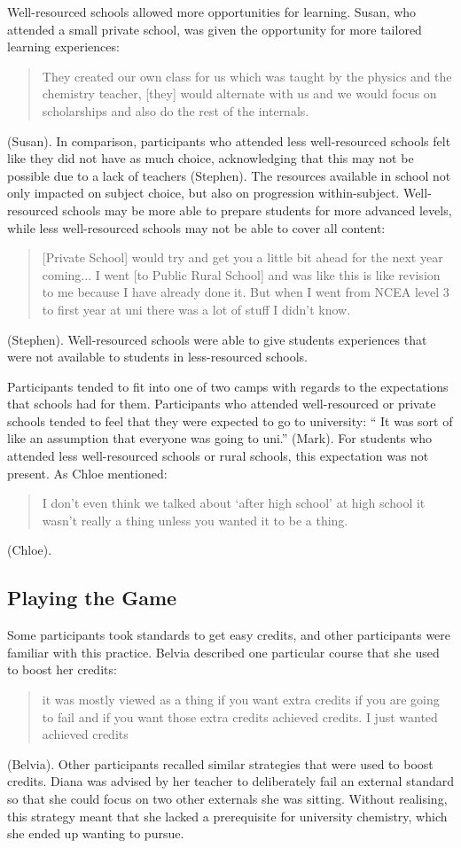 \documentclass[a4paper,man,natbib]{apa6}
\begin{document}
Well-resourced schools allowed more opportunities for learning. Susan, who attended a small private school, was given the opportunity for more tailored learning experiences: \blockquote{They created our own class for us which was taught by the physics and the chemistry teacher, [they] would alternate with us and we would focus on scholarships and also do the rest of the internals.} (Susan). In comparison, participants who attended less well-resourced schools felt like they did not have as much choice, acknowledging that this may not be possible due to a lack of teachers (Stephen). The resources available in school not only impacted on subject choice, but also on progression within-subject. Well-resourced schools may be more able to prepare students for more advanced levels, while less well-resourced schools may not be able to cover all content: \blockquote{[Private School] would try and get you a little bit ahead for the next year coming... I went [to Public Rural School] and was like this is like revision to me because I have already done it. But when I went from NCEA level 3 to first year at uni there was a lot of stuff I didn't know.} (Stephen). Well-resourced schools were able to give students experiences that were not available to students in less-resourced schools. 

Participants tended to fit into one of two camps with regards to the expectations that schools had for them. Participants who attended well-resourced or private schools tended to feel that they were expected to go to university: `` It was sort of like an assumption that everyone was going to uni.'' (Mark). For students who attended less well-resourced schools or rural schools, this expectation was not present. As Chloe mentioned: \blockquote{I don't even think we talked about `after high school' at high school it wasn't really a thing unless you wanted it to be a thing.} (Chloe). 

 

\subsection{Playing the Game}
Some participants took standards to get easy credits, and other participants were familiar with this practice. Belvia described one particular course that she used to boost her credits: \blockquote{it was mostly viewed as a thing if you want extra credits if you are going to fail and if you want those extra credits achieved credits. I just wanted achieved credits} (Belvia). Other participants recalled similar strategies that were used to boost credits. Diana was advised by her teacher to deliberately fail an external standard so that she could focus on two other externals she was sitting. Without realising, this strategy meant that she lacked a prerequisite for university chemistry, which she ended up wanting to pursue. 
\end{document}

